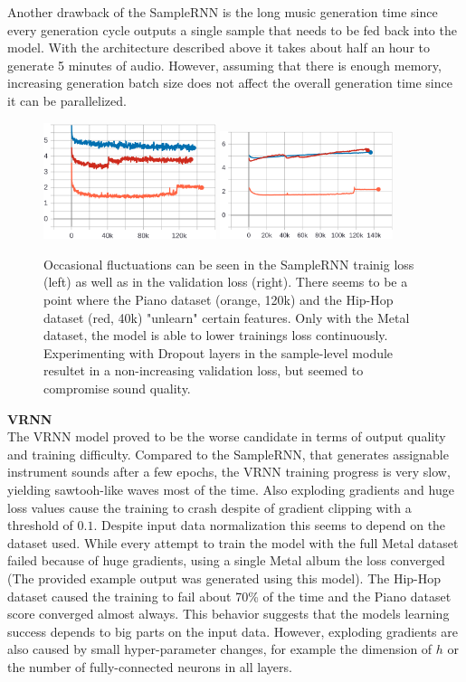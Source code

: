 \documentclass[12pt]{article}
\begin{document}
Another drawback of the SampleRNN is the long music generation time since every generation cycle outputs a single sample that needs to be fed back into the model.
With the architecture described above it takes about half an hour to generate 5 minutes of audio.
However, assuming that there is enough memory, increasing generation batch size does not affect the overall generation time since it can be parallelized.
\begin{figure}
\includegraphics[width=0.45\textwidth]{img/sample-rnn-train.png}
\includegraphics[width=0.45\textwidth]{img/sample-rnn-val.png}
\caption{Occasional fluctuations can be seen in the SampleRNN trainig loss (left) as well as in the validation loss (right). There seems to be a point where the Piano dataset (orange, 120k) and the Hip-Hop dataset (red, 40k) "unlearn" certain features. Only with the Metal dataset, the model is able to lower trainings loss continuously. Experimenting with Dropout layers in the sample-level module resultet in a non-increasing validation loss, but seemed to compromise sound quality.}
\label{fig:samplernn-eval}
\end{figure}




\textbf{VRNN}\\
The VRNN model proved to be the worse candidate in terms of output quality and training difficulty.
Compared to the SampleRNN, that generates assignable instrument sounds after a few epochs, the VRNN training progress is very slow, yielding sawtooh-like waves most of the time.
Also exploding gradients and huge loss values cause the training to crash despite of gradient clipping with a threshold of $0.1$.
Despite input data normalization this seems to depend on the dataset used.
While every attempt to train the model with the full Metal dataset failed because of huge gradients, using a single Metal album the loss converged (The provided example output was generated using this model).
The Hip-Hop dataset caused the training to fail about 70\% of the time and the Piano dataset score converged almost always.
This behavior suggests that the models learning success depends to big parts on the input data.
However, exploding gradients are also caused by small hyper-parameter changes, for example the dimension of $h$ or the number of fully-connected neurons in all layers.
\end{document}

